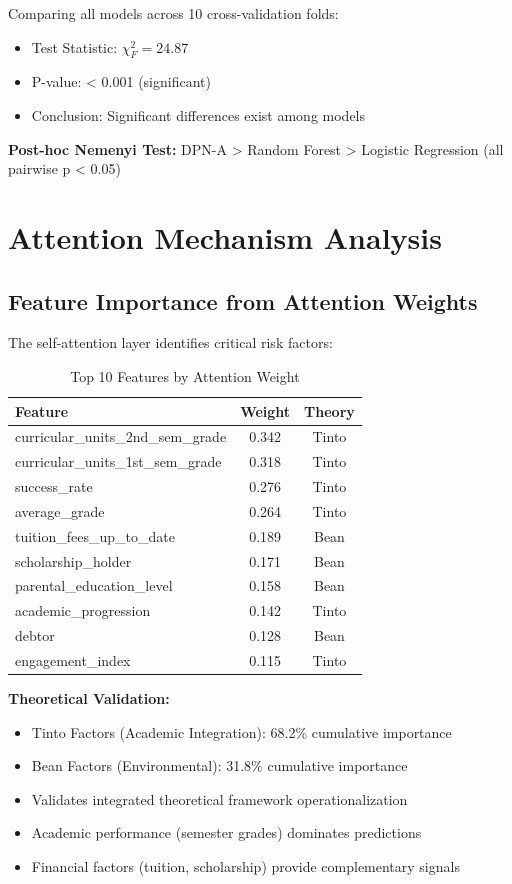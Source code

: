 Comparing all models across 10 cross-validation folds:

\begin{itemize}
\item Test Statistic: $\chi^2_F = 24.87$
\item P-value: < 0.001 (significant)
\item Conclusion: Significant differences exist among models
\end{itemize}

\textbf{Post-hoc Nemenyi Test:} DPN-A > Random Forest > Logistic Regression (all pairwise p < 0.05)

\section{Attention Mechanism Analysis}

\subsection{Feature Importance from Attention Weights}

The self-attention layer identifies critical risk factors:

\begin{table}[h]
\centering
\caption{Top 10 Features by Attention Weight}
\label{tab:attention_weights}
\begin{tabular}{lcc}
\toprule
\textbf{Feature} & \textbf{Weight} & \textbf{Theory} \\
\midrule
curricular\_units\_2nd\_sem\_grade & 0.342 & Tinto \\
curricular\_units\_1st\_sem\_grade & 0.318 & Tinto \\
success\_rate & 0.276 & Tinto \\
average\_grade & 0.264 & Tinto \\
tuition\_fees\_up\_to\_date & 0.189 & Bean \\
scholarship\_holder & 0.171 & Bean \\
parental\_education\_level & 0.158 & Bean \\
academic\_progression & 0.142 & Tinto \\
debtor & 0.128 & Bean \\
engagement\_index & 0.115 & Tinto \\
\bottomrule
\end{tabular}
\end{table}

\textbf{Theoretical Validation:}
\begin{itemize}
\item Tinto Factors (Academic Integration): 68.2\% cumulative importance
\item Bean Factors (Environmental): 31.8\% cumulative importance
\item Validates integrated theoretical framework operationalization
\item Academic performance (semester grades) dominates predictions
\item Financial factors (tuition, scholarship) provide complementary signals
\end{itemize}

